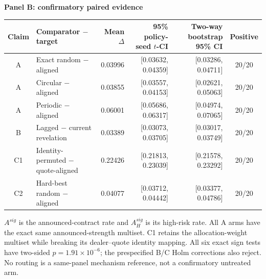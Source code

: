 \begin{table}[t]
\vspace{5pt}
\textbf{Panel B: confirmatory paired evidence}\par\vspace{2pt}
\begin{tabular*}{\textwidth}{@{\extracolsep{\fill}}clrrrc@{}}
\toprule
Claim & Comparator $-$ target & Mean $\Delta$ & 95\% policy-seed $t$-CI &
Two-way bootstrap 95\% CI & Positive \\
\midrule
A & Exact random $-$ aligned & 0.03996 & [0.03632, 0.04359] & [0.03286, 0.04711] & 20/20 \\
A & Circular $-$ aligned & 0.03855 & [0.03557, 0.04153] & [0.02621, 0.05063] & 20/20 \\
A & Periodic $-$ aligned & 0.06001 & [0.05686, 0.06317] & [0.04974, 0.07065] & 20/20 \\
B & Lagged $-$ current revelation & 0.03389 & [0.03073, 0.03705] & [0.03017, 0.03749] & 20/20 \\
C1 & Identity-permuted $-$ quote-aligned & 0.22426 & [0.21813, 0.23039] & [0.21578, 0.23292] & 20/20 \\
C2 & Hard-best random $-$ aligned & 0.04077 & [0.03712, 0.04442] & [0.03377, 0.04786] & 20/20 \\
\bottomrule
\end{tabular*}
\vspace{2pt}
\parbox{\textwidth}{\scriptsize
$A^{sig}$ is the announced-contract rate and $A^{sig}_{H}$ is its high-risk
rate. All A arms have the exact same announced-strength multiset. C1 retains
the allocation-weight multiset while breaking its dealer--quote identity
mapping. All six exact sign tests have two-sided $p=1.91\times10^{-6}$; the
prespecified B/C Holm corrections also reject. No routing is a same-panel
mechanism reference, not a confirmatory untreated arm.}
\end{table}
